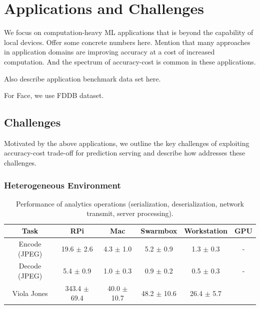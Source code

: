 \newpage
\section{Applications and Challenges}
\label{sec:motivation}

We focus on computation-heavy ML applications that is beyond the capability of
local devices. Offer some concrete numbers here. Mention that many approaches in
application domains are improving accuracy at a cost of increased
computation. And the spectrum of accuracy-cost is common in these applications.

Also describe application benchmark data set here.

For Face, we use FDDB dataset.

\subsection{Challenges}
\label{sec:challenges}

Motivated by the above applications, we outline the key challenges of exploiting
accuracy-cost trade-off for prediction serving and describe how \sysname{}
addresses these challenges.

\subsubsection*{Heterogeneous Environment}


\begin{table}
  \centering
  \begin{tabular}{c c c c c c}
    \toprule
    Task          & RPi              & Mac             & Swarmbox        & Workstation    & GPU \\
    \midrule
    Encode (JPEG) & 19.6 $\pm$ 2.6   & 4.3 $\pm$ 1.0   & 5.2 $\pm$ 0.9   & 1.3 $\pm$ 0.3  & -   \\
    Decode (JPEG) & 5.4 $\pm$ 0.9    & 1.0 $\pm$ 0.3   & 0.9 $\pm$ 0.2   & 0.5 $\pm$ 0.3  & -   \\
    Viola Jones   & 343.4 $\pm$ 69.4 & 40.0 $\pm$ 10.7 & 48.2 $\pm$ 10.6 & 26.4 $\pm$ 5.7 &     \\
    \bottomrule
  \end{tabular}
  \caption{Performance of analytics operations (serialization, deserialization,
    network transmit, server processing).}
  \label{tab:perf-motiv}
\end{table}

